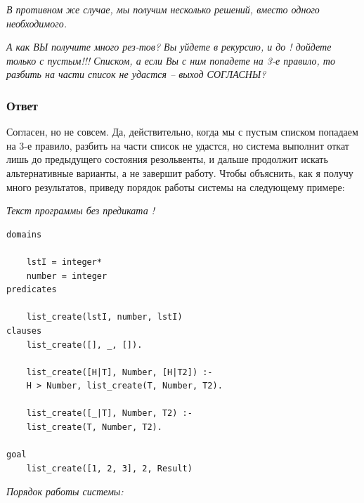 \documentclass[a4paper,12pt]{article}
\begin{document}
	\textit{В противном же случае, мы получим несколько решений, вместо одного необходимого.}
	
	\textit{А как ВЫ получите много рез-тов? Вы уйдете в рекурсию, и до ! дойдете только с пустым!!! Списком, а если Вы с ним попадете на 3-е правило, то разбить на части список не удастся – выход СОГЛАСНЫ?}
	
	
	\subsubsection*{Ответ}
	
	Согласен, но не совсем. Да, действительно, когда мы с пустым списком попадаем на 3-е правило, разбить на части список не удастся, но система выполнит откат лишь до предыдущего состояния резольвенты, и дальше продолжит искать альтернативные варианты, а не завершит работу. Чтобы объяснить, как я получу много результатов, приведу порядок работы системы на следующему примере:
	
	\textit{Текст программы без предиката !}
	
	\begin{verbatim}
domains
	
	lstI = integer*
	number = integer
predicates
	
	list_create(lstI, number, lstI)
clauses
	list_create([], _, []).
	
	list_create([H|T], Number, [H|T2]) :-
	H > Number, list_create(T, Number, T2).
	
	list_create([_|T], Number, T2) :-
	list_create(T, Number, T2).
	
goal
	list_create([1, 2, 3], 2, Result)
	\end{verbatim}
	
	\textit{Порядок работы системы:}
	
\end{document}
